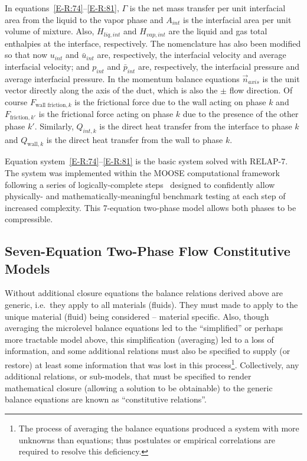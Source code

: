 \begin{itemize}
In equations~\eqref{E-R:74}--\eqref{E-R:81}, $\Gamma$ is the net mass transfer per unit
interfacial area from the liquid to the vapor phase and $A_{int}$ is
the interfacial area per unit volume of mixture.  Also, $H_{liq, int}$
and $H_{vap, int}$ are the liquid and gas total enthalpies at the
interface, respectively.  The nomenclature has also been modified so
that now $u_{int}$ and $\bar{u}_{int}$ are, respectively, the
interfacial velocity and average interfacial velocity; and $p_{int}$
and $\bar{p}_{int}$ are, respectively, the interfacial pressure and
average interfacial pressure.  In the momentum balance equations
$\vec{n}_{axis}$ is the unit vector directly along the axis of the
duct, which is also the $\pm$ flow direction.  Of course
$F_{\text{wall friction}, k}$ is the frictional force due to the wall acting on phase
$k$ and $F_{\text{friction}, k'}$ is the frictional force acting on
phase $k$ due to the presence of the other phase $k'$.
Similarly, $Q_{int, k}$ is the direct heat transfer from the interface
to phase $k$ and $Q_{\text{wall}, k}$ is the direct heat transfer from
the wall to phase $k$.

Equation system~\eqref{E-R:74}--\eqref{E-R:81} is the basic system
solved with RELAP-7.  The system was implemented within the MOOSE
computational framework following a series of logically-complete
steps~\cite{Berry_2013} designed to confidently allow physically- and
mathematically-meaningful benchmark testing at each step of increased
complexity.  This 7-equation two-phase model allows both phases to be
compressible.

\subsection{Seven-Equation Two-Phase Flow Constitutive Models}
Without additional closure equations the balance relations derived
above are generic, i.e.\ they apply to all materials (fluids).  They
must made to apply to the unique material (fluid) being considered --
material specific.  Also, though averaging the microlevel
balance equations led to the ``simplified'' or perhaps more tractable
model above, this simplification (averaging) led to a loss of information,
and some additional relations must also be specified to supply (or
restore) at least some information that was lost in this
process\footnote{The process of averaging the balance equations produced a
system with more unknowns than equations; thus postulates or empirical
correlations are required to resolve this deficiency.}.  Collectively,
any additional relations, or sub-models, that must be specified to
render mathematical closure (allowing a solution to be obtainable) to
the generic balance equations are known as ``constitutive
relations''.


\end{itemize}
